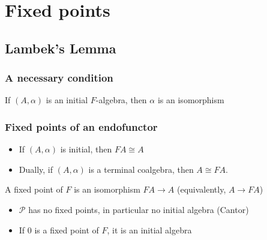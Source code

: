 \documentclass{beamer}
\begin{document}
\section{Fixed points}
\subsection{Lambek's Lemma}
\begin{frame}
  \frametitle{A necessary condition}
  \begin{lemma}[Lambek]
    If $(A, \alpha)$ is an initial $F$-algebra, then $\alpha$ is an isomorphism
  \end{lemma}
\end{frame}
\begin{frame}
  \frametitle{Fixed points of an endofunctor}
  \begin{itemize}
    \item If $(A,\alpha)$ is initial, then $FA \cong A$
    \item Dually, if $(A, \alpha)$ is a terminal coalgebra, then $A \cong FA$.
  \end{itemize}
  \pause
  \begin{definition}
    A fixed point of $F$ is an isomorphism $FA \to A$ (equivalently, $A \to FA$)
  \end{definition}
  \pause
  \begin{itemize}
    \item $\mathcal{P}$ has no fixed points, in particular no initial algebra (Cantor)
    \item If $0$ is a fixed point of $F$, it is an initial algebra
  \end{itemize}
\end{frame}
\end{document}
